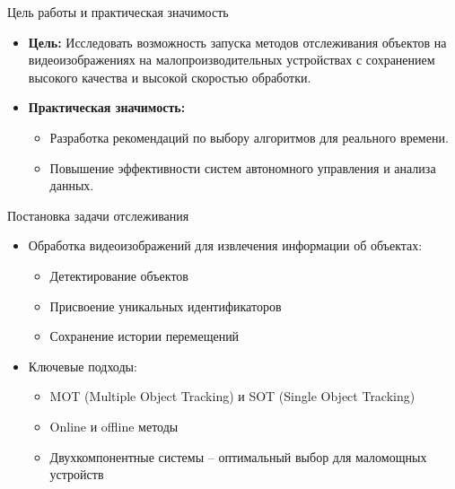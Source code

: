 \documentclass{beamer} %
\begin{document}
\begin{frame}{Цель работы и практическая значимость}
  \begin{itemize}
    \item \textbf{Цель:} Исследовать возможность запуска методов отслеживания объектов на видеоизображениях на малопроизводительных устройствах с сохранением высокого качества и высокой скоростью обработки.
    \item \textbf{Практическая значимость:}
      \begin{itemize}
        \item Разработка рекомендаций по выбору алгоритмов для реального времени.
        \item Повышение эффективности систем автономного управления и анализа данных.
      \end{itemize}
  \end{itemize}
\end{frame}


\begin{frame}{Постановка задачи отслеживания}
  \begin{itemize}
    \item Обработка видеоизображений для извлечения информации об объектах:
      \begin{itemize}
        \item Детектирование объектов
        \item Присвоение уникальных идентификаторов
        \item Сохранение истории перемещений
      \end{itemize}
    \item Ключевые подходы:
      \begin{itemize}
        \item MOT (Multiple Object Tracking) и SOT (Single Object Tracking)
        \item Online и offline методы
        \item Двухкомпонентные системы – оптимальный выбор для маломощных устройств
      \end{itemize}
  \end{itemize}
\end{frame}
\end{document}
